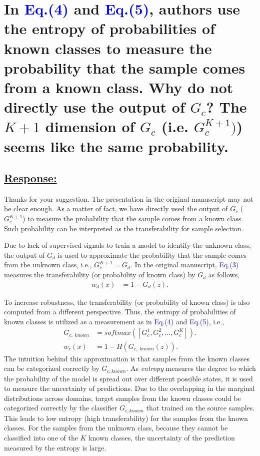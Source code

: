 \section{In \textcolor{blue}{Eq.(4)} and \textcolor{blue}{Eq.(5)}, authors use the entropy of probabilities of known classes to measure the probability that the sample comes from a known class. Why do not directly use the output of $G_c$? The $K+1$ dimension of $G_c$  (i.e. $G_c^{K+1})$) seems like the same probability. }

\subsection*{\underline{\textbf{Response:}}}

Thanks for your suggestion.
The presentation in the original manuscript may not be clear enough.
As a matter of fact, we have directly used the output of $G_c$ ($G_c^{K+1}$) to measure the probability that the sample comes from a known class.
Such probability can be interpreted as the transferability for sample selection.

Due to lack of supervised signals to train a model to identify the unknown class, the output of $G_d$ is used to approximate the probability that the sample comes from the unknown class, i.e., $G_c^{K+1} = G_d$.
In the original manuscript, \textcolor{blue}{Eq.(3)} measures the transferability (or probability of known class) by $G_d$ as follows,
\begin{align}
    w_d(x) &= 1-G_d(z). \label{eq: domain transferability}
\end{align}

To increase robustness, the transferability (or probability of known class) is also computed from a different perspective.
Thus, the entropy of probabilities of known classes is utilized as a measurement as in \textcolor{blue}{Eq.(4)} and \textcolor{blue}{Eq.(5)}, i.e.,
\begin{align}
    G_{c,\; known} &= softmax([G_c^1,G_c^2,...,G_c^K]).\\
    w_c(x) &= 1-H(G_{c,\; known}(z)). \label{eq: class transferability}
\end{align}
The intuition behind this approximation is that samples from the known classes can be categorized correctly by $G_{c, known}$.
As \textit{entropy} measures the degree to which the probability of the model is spread out over different possible states, it is used to measure the uncertainty of predictions.
Due to the overlapping in the marginal distributions across domains, target samples from the known classes could be categorized correctly by the classifier $G_{c, known}$ that trained on the source samples.
This leads to low entropy (high transferability) for the samples from the known classes.
For the samples from the unknown class, because they cannot be classified into one of the $K$ known classes, the uncertainty of the prediction measured by the entropy is large.

